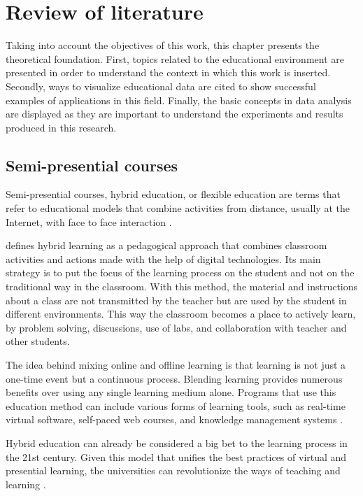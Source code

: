 \chapter{Review of literature}
\label{ch:Literature}

Taking into account the objectives of this work, this chapter presents the theoretical foundation. First, topics related to the educational environment are presented in order to understand the context in which this work is inserted. Secondly, ways to visualize educational data are cited to show successful examples of applications in this field. Finally, the basic concepts in data analysis are displayed as they are important to understand the experiments and results produced in this research.

\section{Semi-presential courses}

Semi-presential courses, hybrid education, or flexible education are terms that refer to educational models that combine activities from distance, usually at the Internet, with face to face interaction \cite{camilloo2010interaccao}.

\cite{bacich2015ensino} defines hybrid learning as a pedagogical approach that combines classroom activities and actions made with the help of digital technologies. Its main strategy is to put the focus of the learning process on the student and not on the traditional way in the classroom. With this method, the material and instructions about a class are not transmitted by the teacher but are used by the student in different environments. This way the classroom becomes a place to actively learn, by problem solving, discussions, use of labs, and collaboration with teacher and other students.

The idea behind mixing online and offline learning is that learning is not just a one-time event but a continuous process. Blending learning provides numerous benefits over using any single learning medium alone. Programs that use this education method can include various forms of learning tools, such as real-time virtual software, self-paced web courses, and knowledge management systems \cite{singh2021building}.

Hybrid education can already be considered a big bet to the learning process in the 21st century. Given this model that unifies the best practices of virtual and presential learning, the universities can revolutionize the ways of teaching and learning \cite{de2021ensino}.

